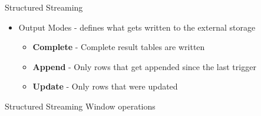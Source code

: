 \documentclass{beamer}
\begin{document}
\begin{frame}[t]{Structured Streaming}
\begin{itemize}
	\item<1-> Output Modes - defines what gets written to the external storage
	\begin{itemize}
		\item<2-> \textbf{Complete} - Complete result tables are written
		\item<3-> \textbf{Append} - Only rows that get appended since the last trigger
		\item<4-> \textbf{Update} - Only rows that were updated
	\end{itemize}
\end{itemize}
\end{frame}

\begin{frame}{Structured Streaming}
Window operations
\end{frame}
\end{document}
